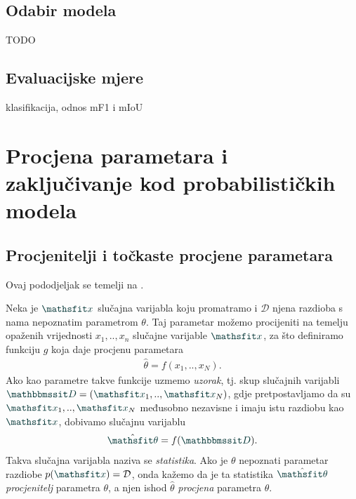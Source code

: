 \documentclass[utf8, diplomski, lmodern]{fer}
\begin{document}
\subsection{Odabir modela}
TODO


\citet{Murray:2005:NEBOR} %


\subsection{Evaluacijske mjere}

klasifikacija, odnos mF1 i mIoU

\section{Procjena parametara i zaključivanje kod probabilističkih modela}

\subsection{Procjenitelji i točkaste procjene parametara}

Ovaj pododjeljak se temelji na \citet{Elezovic:2007:VSSV}.

Neka je $\rvar x$ slučajna varijabla koju promatramo i $\mathcal D$ njena razdioba s nama nepoznatim parametrom $\theta$. Taj parametar možemo procijeniti na temelju opaženih vrijednosti $x_1,..,x_n$ slučajne varijable $\rvar x$, za što definiramo funkciju $g$ koja daje procjenu parametara
\begin{align}
\hat{\theta}=f(x_1,..,x_N) \text{.}
\end{align}
Ako kao parametre takve funkcije uzmemo \emph{uzorak}, tj. skup slučajnih varijabli $\rset D=\del{\rvar x_1,..,\rvar x_N}$, gdje pretpostavljamo da su $\rvar x_1,..,\rvar x_N$ međusobno nezavisne i imaju istu razdiobu kao $\rvar x$, dobivamo slučajnu varijablu
\begin{align}
\hat{\rvar\theta}=f(\rset D) \text{.}
\end{align}
Takva slučajna varijabla naziva se \emph{statistika}. Ako je $\theta$ nepoznati parametar razdiobe $p(\rvar x)=\mathcal{D}$, onda kažemo da je ta statistika $\hat{\rvar\theta}$ \emph{procjenitelj} parametra $\theta$, a njen ishod $\hat{\theta}$ \emph{procjena} parametra $\theta$.
\end{document}
